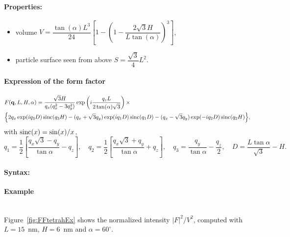 \paragraph{Properties:}
\begin{itemize}
\item volume $V= \dfrac{\tan(\alpha) L^3}{24} \left[1- \left(1 -
  \dfrac{2\sqrt{3} H}{L \tan(\alpha)} \right)^3\right]$,
\item particle surface seen from above $S =\dfrac{\sqrt{3}}{4}L^2$.
\end{itemize}

\paragraph{Expression of the form factor}

\begin{align*}
&F(\mathbf{q}, L, H, \alpha)=\frac{\sqrt{3}H}{q_x (q_x^2-3q_y^2)}
\exp\left(i\frac{q_z L}{2\tan (\alpha)\sqrt{3}}\right) \times \\
&\Big\{2q_x \exp(iq_3 D)\operatorname{sinc}(q_3 H) - (q_x +\sqrt{3}q_y)
\exp(iq_1 D)\operatorname{sinc}(q_1 D) -(q_x-\sqrt{3}q_y)\exp(-iq_2
D)\operatorname{sinc}(q_2 H) \Big\}, 
\end{align*}
with $\operatorname{sinc}(x)=\sin(x)/x$,
\begin{equation*}
q_1  =\frac{1}{2}\left[\frac{q_x\sqrt{3} -q_y}{\tan \alpha}-q_z \right],
\quad q_2 = \frac{1}{2}\left[\frac{q_x\sqrt{3} +q_y}{\tan \alpha}+q_z
\right], \quad 
q_3 = \frac{q_y}{\tan \alpha} -\frac{q_z}{2}, \quad D = \frac{L \tan \alpha}{\sqrt{3}} -H.
\end{equation*}

\paragraph{Syntax:} 

\paragraph{Example}\mbox{}\\
Figure~\ref{fig:FFtetrahEx} shows the normalized intensity
$|F|^2/V^2$, computed with $L=15$~nm, $H=6$~nm and $\alpha =60
^{\circ}$.

